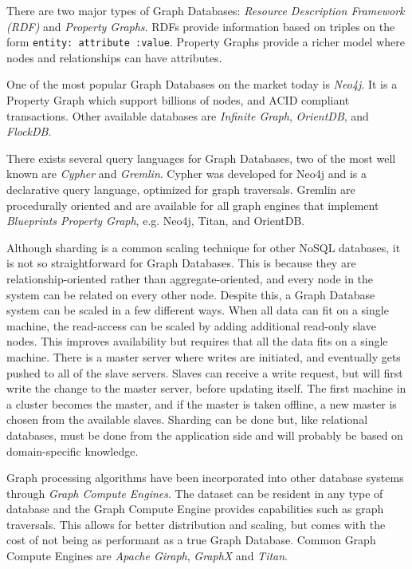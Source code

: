 There are two major types of Graph Databases: \emph{Resource Description Framework (RDF)} and \emph{Property Graphs}. RDFs provide information based on triples on the form \texttt{entity: attribute :value}. Property Graphs provide a richer model where nodes and relationships can have attributes.

One of the most popular Graph Databases on the market today is \emph{Neo4j}. It is a Property Graph which support billions of nodes, and ACID compliant transactions. Other available databases are \emph{Infinite Graph}, \emph{OrientDB}, and \emph{FlockDB}.

There exists several query languages for Graph Databases, two of the most well known are \emph{Cypher} and \emph{Gremlin}. Cypher was developed for Neo4j and is a declarative query language, optimized for graph traversals. Gremlin are procedurally oriented and are available for all graph engines that implement \emph{Blueprints Property Graph}, e.g. Neo4j, Titan, and OrientDB.

Although sharding is a common scaling technique for other NoSQL databases, it is not so straightforward for Graph Databases. This is because they are relationship-oriented rather than aggregate-oriented, and every node in the system can be related on every other node. Despite this, a Graph Database system can be scaled in a few different ways. When all data can fit on a single machine, the read-access can be scaled by adding additional read-only slave nodes. This improves availability but requires that all the data fits on a single machine. There is a master server where writes are initiated, and eventually gets pushed to all of the slave servers. Slaves can receive a write request, but will first write the change to the master server, before updating itself. The first machine in a cluster becomes the master, and if the master is taken offline, a new master is chosen from the available slaves. Sharding can be done but, like relational databases, must be done from the application side and will probably be based on domain-specific knowledge.

Graph processing algorithms have been incorporated into other database systems through \emph{Graph Compute Engines}. The dataset can be resident in any type of database and the Graph Compute Engine provides capabilities such as graph traversals. This allows for better distribution and scaling, but comes with the cost of not being as performant as a true Graph Database. Common Graph Compute Engines are \emph{Apache Giraph}, \emph{GraphX} and \emph{Titan}.


